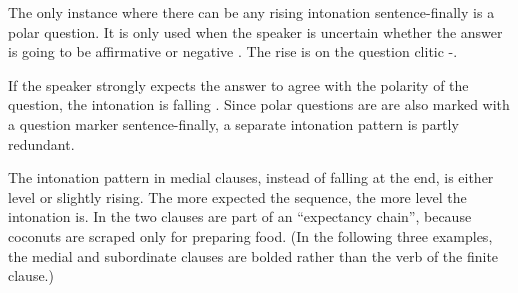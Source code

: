 The only instance where there can be any rising intonation sentence-finally is a polar question.  It is only used when the speaker is uncertain whether the answer is going to be affirmative or negative .  The rise is on the question clitic -.  





If the speaker strongly expects the answer to agree with the polarity of the question, the intonation is falling . Since polar questions are are also marked with a question marker \textstyleStyleVernacularWordsItalic{=} sentence-finally, a separate intonation pattern is partly redundant.





The intonation pattern in medial clauses, instead of falling at the end, is either level or slightly rising.  The more expected the sequence, the more level the intonation is. In  the two clauses are part of an ``expectancy chain'', because coconuts are scraped only for preparing food. (In the following three examples, the medial and subordinate clauses are bolded rather than the verb of the finite clause.)


